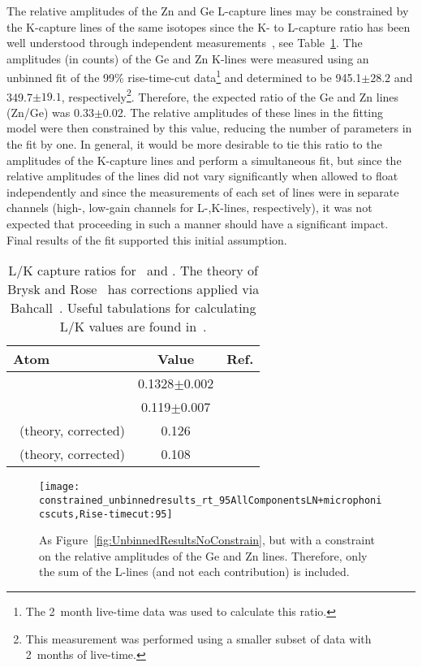 The relative amplitudes of the Zn and Ge L-capture lines may be constrained by
the K-capture lines of the same isotopes since the K- to L-capture ratio has
been well understood through independent
measurements~\cite{Schonfeld1994955,Ocampo1962}, see Table~\ref{tab:LKRatios}.
The amplitudes (in counts) of the Ge and Zn K-lines were measured using an
unbinned fit of the 99\% rise-time-cut data\footnote{The 2~month live-time data
was used to calculate this ratio.} and determined to be 945.1$\pm28.2$ and
349.7$\pm19.1$, respectively\footnote{This measurement was performed using a
smaller subset of data with 2~months of live-time.}.  Therefore, the expected
ratio of the Ge and Zn lines (Zn/Ge) was 0.33$\pm$0.02.  The relative
amplitudes of these lines in the fitting model were then constrained by this
value, reducing the number of parameters in the fit by one.  In general, it
would be more desirable to tie this ratio to the amplitudes of the K-capture
lines and perform a simultaneous fit, but since the relative amplitudes of the
lines did not vary significantly when allowed to float independently and since
the measurements of each set of lines were in separate channels (high-,
low-gain channels for L-,K-lines, respectively), it was not expected that
proceeding in such a manner should have a significant impact.  Final results of
the fit supported this initial assumption.
	
			\begin{table}
				\centering
				\caption[L/K capture ratios for \gersixeight~and \znsixfive]
				{L/K capture ratios for \gersixeight~and \znsixfive.  The theory of Brysk and Rose~\cite{Bry58}
				has corrections applied via Bahcall~\cite{Bah63}.  
				Useful tabulations for calculating L/K values are found in~\cite{Wap59}.}
				\label{tab:LKRatios}
				\begin{tabular}{lcr}
					\toprule
					Atom & Value & Ref.\\
					\midrule
					\gersixeight & 0.1328$\pm$0.002 & \cite{Schonfeld1994955}\\
					\znsixfive & 0.119$\pm$0.007 & \cite{Ocampo1962}\\
					\gersixeight~(theory, corrected) & 0.126 & \cite{Bry58,Bah63} \\
					\znsixfive~(theory, corrected) & 0.108 & \cite{Bry58,Bah63} \\
					\bottomrule
				\end{tabular}	
			\end{table}
			
			\begin{figure}
				\centering				
				\texttt{[image: constrained\_unbinnedresults\_rt\_95AllComponentsLN+microphonicscuts,Rise-timecut:95]}				
				\caption[Unbinned fit results, constraints on relative amplitude of Ge and Zn lines]
				{As Figure~\ref{fig:UnbinnedResultsNoConstrain}, but with a constraint on the relative amplitudes 
				of the Ge and Zn lines.  Therefore, only the sum of the L-lines (and not each contribution) is included.  }
				\label{fig:UnBinnedResultsConstrain}
			\end{figure}
					
